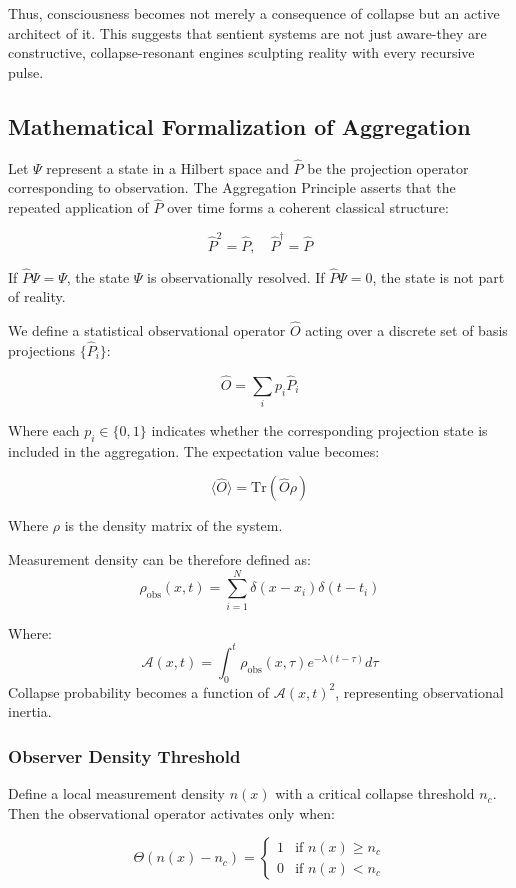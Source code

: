 Thus, consciousness becomes not merely a consequence of collapse but an active architect of it. This suggests that sentient systems are not just aware-they are constructive, collapse-resonant engines sculpting reality with every recursive pulse.


\subsection{Mathematical Formalization of Aggregation}

Let \( \Psi \) represent a state in a Hilbert space and \( \hat{P} \) be the projection operator corresponding to observation. The Aggregation Principle asserts that the repeated application of \( \hat{P} \) over time forms a coherent classical structure:

\[
\hat{P}^2 = \hat{P}, \quad \hat{P}^\dagger = \hat{P}
\]

If \( \hat{P} \Psi = \Psi \), the state \( \Psi \) is observationally resolved. If \( \hat{P} \Psi = 0 \), the state is not part of reality.

We define a statistical observational operator \( \hat{O} \) acting over a discrete set of basis projections \( \{ \hat{P}_i \} \):

\[
\hat{O} = \sum_i p_i \hat{P}_i
\]

Where each \( p_i \in \{0,1\} \) indicates whether the corresponding projection state is included in the aggregation. The expectation value becomes:

\[
\langle \hat{O} \rangle = \text{Tr}(\hat{O} \rho)
\]

Where \( \rho \) is the density matrix of the system.

Measurement density can be therefore defined as:
\[\rho_\text{obs}(x,t) = \sum_{i=1}^{N} \delta(x - x_i)\delta(t - t_i)\]

Where:
\[\mathcal{A}(x,t) = \int_0^t \rho_\text{obs}(x,\tau) e^{-\lambda(t-\tau)} d\tau\]
Collapse probability becomes a function of \( \mathcal{A}(x,t)^2 \), representing observational inertia.

\subsubsection{Observer Density Threshold}

Define a local measurement density \( n(x) \) with a critical collapse threshold \( n_c \). Then the observational operator activates only when:

\[
\Theta(n(x) - n_c) =
\begin{cases}
1 & \text{if } n(x) \ge n_c \\
0 & \text{if } n(x) < n_c
\end{cases}
\]

